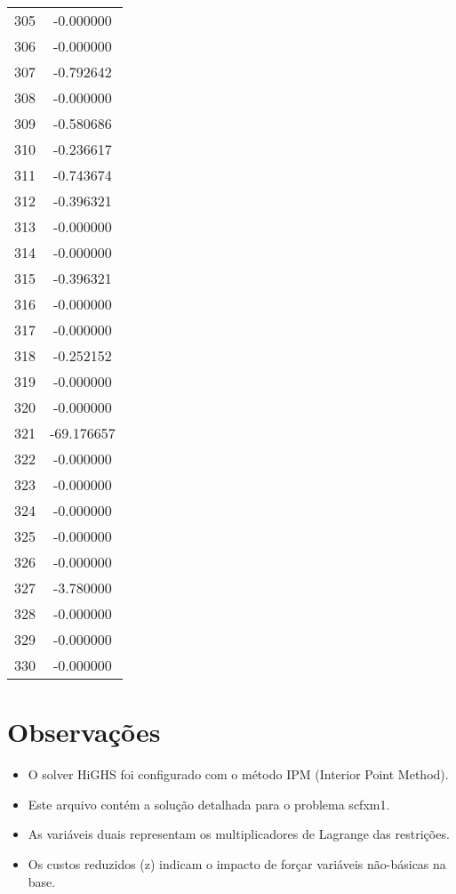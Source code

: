 \documentclass[12pt]{article}
\begin{document}
\begin{longtable}{@{}cc@{}}
305 & -0.000000 \\
306 & -0.000000 \\
307 & -0.792642 \\
308 & -0.000000 \\
309 & -0.580686 \\
310 & -0.236617 \\
311 & -0.743674 \\
312 & -0.396321 \\
313 & -0.000000 \\
314 & -0.000000 \\
315 & -0.396321 \\
316 & -0.000000 \\
317 & -0.000000 \\
318 & -0.252152 \\
319 & -0.000000 \\
320 & -0.000000 \\
321 & -69.176657 \\
322 & -0.000000 \\
323 & -0.000000 \\
324 & -0.000000 \\
325 & -0.000000 \\
326 & -0.000000 \\
327 & -3.780000 \\
328 & -0.000000 \\
329 & -0.000000 \\
330 & -0.000000 \\

\end{longtable}


\section{Observações}

\begin{itemize}
\item O solver HiGHS foi configurado com o método IPM (Interior Point Method).
\item Este arquivo contém a solução detalhada para o problema scfxm1.
\item As variáveis duais representam os multiplicadores de Lagrange das restrições.
\item Os custos reduzidos (z) indicam o impacto de forçar variáveis não-básicas na base.
\end{itemize}
\end{document}
